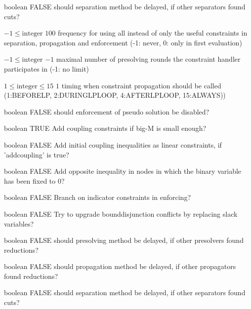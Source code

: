 %
{boolean}%
{FALSE}%
{should separation method be delayed, if other separators found cuts?}%
{}

%
{$-1\leq\textrm{integer}$}%
{$100$}%
{frequency for using all instead of only the useful constraints in separation, propagation and enforcement (-1: never, 0: only in first evaluation)}%
{}

%
{$-1\leq\textrm{integer}$}%
{$-1$}%
{maximal number of presolving rounds the constraint handler participates in (-1: no limit)}%
{}

%
{$1\leq\textrm{integer}\leq15$}%
{$1$}%
{timing when constraint propagation should be called (1:BEFORELP, 2:DURINGLPLOOP, 4:AFTERLPLOOP, 15:ALWAYS))}%
{}

%
{boolean}%
{FALSE}%
{should enforcement of pseudo solution be disabled?}%
{}

%
{boolean}%
{TRUE}%
{Add coupling constraints if big-M is small enough?}%
{}

%
{boolean}%
{FALSE}%
{Add initial coupling inequalities as linear constraints, if 'addcoupling' is true?}%
{}

%
{boolean}%
{FALSE}%
{Add opposite inequality in nodes in which the binary variable has been fixed to 0?}%
{}

%
{boolean}%
{FALSE}%
{Branch on indicator constraints in enforcing?}%
{}

%
{boolean}%
{FALSE}%
{Try to upgrade bounddisjunction conflicts by replacing slack variables?}%
{}

%
{boolean}%
{FALSE}%
{should presolving method be delayed, if other presolvers found reductions?}%
{}

%
{boolean}%
{FALSE}%
{should propagation method be delayed, if other propagators found reductions?}%
{}

%
{boolean}%
{FALSE}%
{should separation method be delayed, if other separators found cuts?}%
{}

